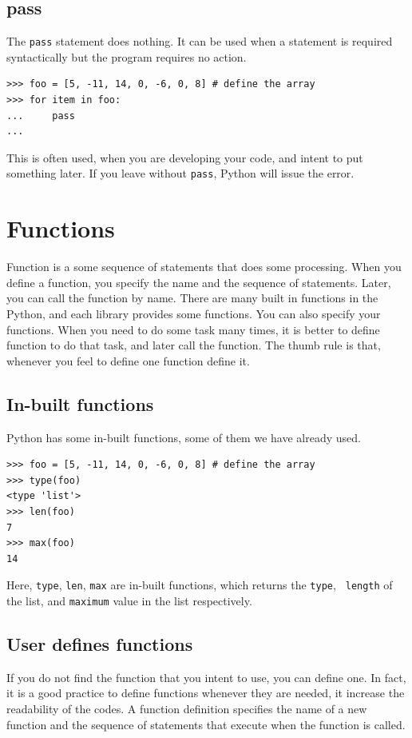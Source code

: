 \documentclass[10pt]{book}
\begin{document}
{\subsection{pass}
The \verb"pass" statement does nothing. It can be used when a statement is required syntactically but the program requires no action. 
\beforeverb
\begin{verbatim}
>>> foo = [5, -11, 14, 0, -6, 0, 8] # define the array
>>> for item in foo:
...     pass
... 
\end{verbatim}
\afterverb
This is often used, when you are developing your code, and intent to put something later. If you leave without \verb"pass", Python will issue the error.

\section{Functions}
Function is a some sequence of statements that does some processing. When you define a function, you specify the name and the sequence of statements.  Later, you can call the function by name. There are many built in functions in the Python, and each library provides some functions. You can also specify your functions. When you need to do some task many times, it is better to define function to do that task, and later call the function. The thumb rule is that, whenever you feel to define one function define it.

\subsection{In-built functions}
Python has some in-built functions, some of them we have already used. 
\beforeverb
\begin{verbatim}
>>> foo = [5, -11, 14, 0, -6, 0, 8] # define the array
>>> type(foo)
<type 'list'>
>>> len(foo)
7
>>> max(foo)
14
\end{verbatim}
\afterverb
Here, \verb"type", \verb"len", \verb"max" are in-built functions, which returns the \verb"type", \verb" length" of the list, and \verb"maximum" value in the list respectively. 

\subsection{User defines functions}
If you do not find the function that you intent to use, you can define one. In fact, it is a good practice to define functions whenever they are needed, it increase the readability of the codes. A function definition specifies the name of a new function and the sequence of statements that execute when the function is called.

}
\end{document}
